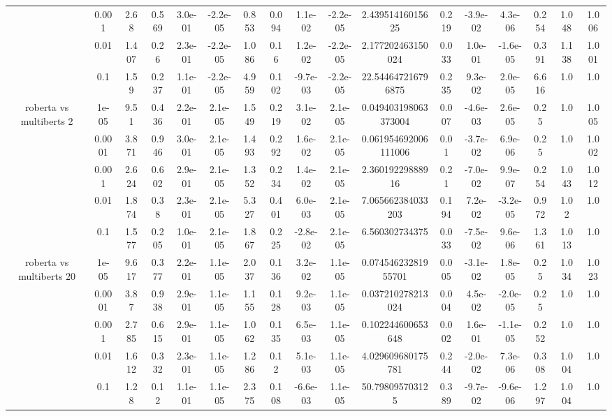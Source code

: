 \begin{tabular}{|c|c|c|c|c|c|c|c|c|c|c|c|c|c|c|c|c|}
 & 0.001 & 2.68 & 0.569 & 3.0e-01 & -2.2e-05 & 0.853 & 0.094 & 1.1e-02 & -2.2e-05 & 2.43951416015625 & 0.219 & -3.9e-02 & 4.3e-06 & 0.254 & 1.048 & 1.006 \\
 & 0.01 & 1.407 & 0.26 & 2.3e-01 & -2.2e-05 & 1.086 & 0.16 & 1.2e-02 & -2.2e-05 & 2.177202463150024 & 0.033 & 1.0e-01 & -1.6e-05 & 0.391 & 1.138 & 1.001 \\
 & 0.1 & 1.59 & 0.237 & 1.1e-01 & -2.2e-05 & 4.959 & 0.102 & -9.7e-03 & -2.2e-05 & 22.544647216796875 & 0.235 & 9.3e-02 & 2.0e-05 & 6.616 & 1.0 & 1.0 \\
\hline
\multirow{5}{*}{roberta  vs multiberts 2} & 1e-05 & 9.51 & 0.436 & 2.2e-01 & 2.1e-05 & 1.549 & 0.219 & 3.1e-02 & 2.1e-05 & 0.049403198063373004 & 0.007 & -4.6e-03 & 2.6e-05 & 0.25 & 1.0 & 1.005 \\
 & 0.0001 & 3.871 & 0.946 & 3.0e-01 & 2.1e-05 & 1.493 & 0.292 & 1.6e-02 & 2.1e-05 & 0.061954692006111006 & 0.01 & -3.7e-02 & 6.9e-06 & 0.25 & 1.0 & 1.002 \\
 & 0.001 & 2.624 & 0.602 & 2.9e-01 & 2.1e-05 & 1.352 & 0.234 & 1.4e-02 & 2.1e-05 & 2.36019229888916 & 0.21 & -7.0e-02 & 9.9e-07 & 0.254 & 1.043 & 1.012 \\
 & 0.01 & 1.874 & 0.38 & 2.3e-01 & 2.1e-05 & 5.327 & 0.401 & 6.0e-03 & 2.1e-05 & 7.065662384033203 & 0.194 & 7.2e-02 & -3.2e-05 & 0.972 & 1.02 & 1.0 \\
 & 0.1 & 1.577 & 0.205 & 1.0e-01 & 2.1e-05 & 1.867 & 0.225 & -2.8e-02 & 2.1e-05 & 6.560302734375 & 0.033 & -7.5e-02 & 9.6e-06 & 1.361 & 1.013 & 1.0 \\
\hline
\multirow{5}{*}{roberta  vs multiberts 20} & 1e-05 & 9.617 & 0.377 & 2.2e-01 & 1.1e-05 & 2.037 & 0.136 & 3.2e-02 & 1.1e-05 & 0.07454623281955701 & 0.005 & -3.1e-02 & 1.8e-05 & 0.25 & 1.034 & 1.023 \\
 & 0.0001 & 3.87 & 0.938 & 2.9e-01 & 1.1e-05 & 1.155 & 0.128 & 9.2e-03 & 1.1e-05 & 0.037210278213024 & 0.004 & 4.5e-02 & -2.0e-05 & 0.25 & 1.0 & 1.0 \\
 & 0.001 & 2.785 & 0.615 & 2.9e-01 & 1.1e-05 & 1.062 & 0.135 & 6.5e-03 & 1.1e-05 & 0.102244600653648 & 0.002 & 1.6e-01 & -1.1e-05 & 0.252 & 1.0 & 1.0 \\
 & 0.01 & 1.612 & 0.332 & 2.3e-01 & 1.1e-05 & 1.286 & 0.12 & 5.1e-03 & 1.1e-05 & 4.029609680175781 & 0.244 & -2.0e-02 & 7.3e-06 & 0.308 & 1.004 & 1.0 \\
 & 0.1 & 1.28 & 0.12 & 1.1e-01 & 1.1e-05 & 2.375 & 0.108 & -6.6e-03 & 1.1e-05 & 50.798095703125 & 0.389 & -9.7e-02 & -9.6e-06 & 1.297 & 1.004 & 1.0 \\

\end{tabular}
